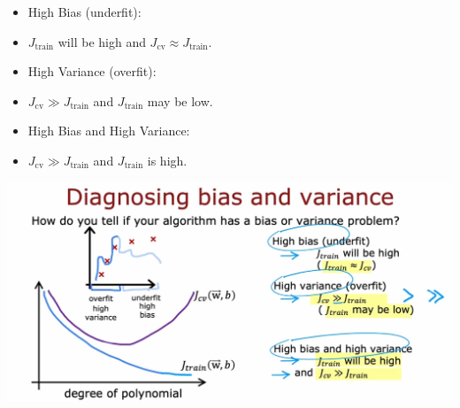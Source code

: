 \begin{itemize}
    \item High Bias (underfit):
    \item[] $J_{\text{train}}$ will be high and $J_{\text{cv}} \approx J_{\text{train}}$.
    \item High Variance (overfit):
    \item[] $J_{\text{cv}} \gg J_{\text{train}}$ and $J_{\text{train}}$ may be low.
    \item High Bias and High Variance:
    \item[] $J_{\text{cv}} \gg J_{\text{train}}$ and $J_{\text{train}}$ is high.
\end{itemize}
\includegraphics*[width=\textwidth]{images/10.8}
